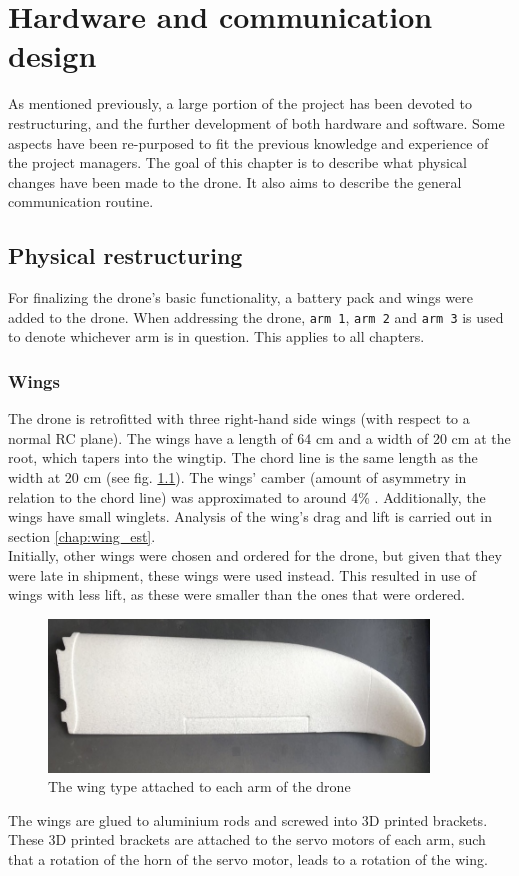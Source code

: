 \chapter{Hardware and communication design}
\label{chap:comm_hardware}
As mentioned previously, a large portion of the project has been devoted to restructuring, and the further development of both hardware and software. Some aspects have been re-purposed to fit the previous knowledge and experience of the project managers. The goal of this chapter is to describe what physical changes have been made to the drone. It also aims to describe the general communication routine.

\section{Physical restructuring}
For finalizing the drone's basic functionality, a battery pack and wings were added to the drone. When addressing the drone, \texttt{arm 1}, \texttt{arm 2} and \texttt{arm 3} is used to denote whichever arm is in question. This applies to all chapters. 
\subsection{Wings}
The drone is retrofitted with three right-hand side wings (with respect to a normal RC plane). The wings have a length of 64 cm and a width of 20 cm at the root, which tapers into the wingtip. The chord line is the same length as the width at 20 cm (see fig. \ref{fig:wing}). The wings' camber (amount of asymmetry in relation to the chord line) was approximated to around 4\% \cite{camber, lift_coefficient}. Additionally, the wings have small winglets. Analysis of the wing's drag and lift is carried out in section \ref{chap:wing_est}. \\
Initially, other wings were chosen and ordered for the drone, but given that they were late in shipment, these wings were used instead. This resulted in use of wings with less lift, as these were smaller than the ones that were ordered. 

\begin{figure}[h!]
    \centering
    \includegraphics[width=0.9\textwidth]{figures/communication_n_hardware/wing.jpg}
    \caption{The wing type attached to each arm of the drone}
    \label{fig:wing}
\end{figure}
The wings are glued to aluminium rods and screwed into 3D printed brackets. These 3D printed brackets are attached to the servo motors of each arm, such that a rotation of the horn of the servo motor, leads to a rotation of the wing.


